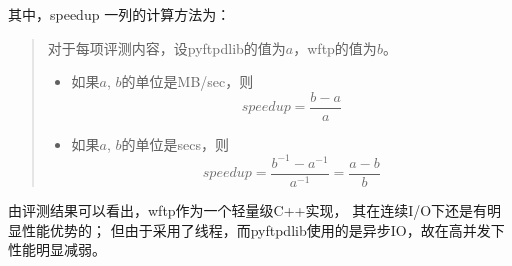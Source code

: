 \documentclass[a4paper]{article}
\begin{document}
其中，speedup 一列的计算方法为：
\begin{quote}
	对于每项评测内容，设pyftpdlib的值为$a$，wftp的值为$b$。
	\begin{itemize}
		\item 如果$a$, $b$的单位是MB/sec，则
			\[ speedup = \dfrac{b-a}{a} \]
		\item 如果$a$, $b$的单位是secs，则
			\[ speedup = \dfrac{b^{-1}-a^{-1}}{a^{-1}} = \dfrac{a-b}{b} \]
	\end{itemize}
\end{quote}

由评测结果可以看出，wftp作为一个轻量级C++实现，
其在连续I/O下还是有明显性能优势的；
但由于采用了线程，而pyftpdlib使用的是异步IO，故在高并发下性能明显减弱。
\end{document}
